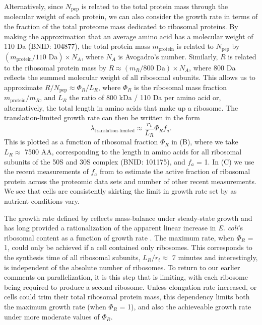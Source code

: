 Alternatively, since $N_\text{pep}$ is related to the total protein mass through
the molecular weight of each protein, we can also consider the growth rate in
terms of the fraction of the total proteome mass dedicated to ribosomal
proteins. By making the approximation that an average amino acid has a molecular
weight of 110 Da (BNID: 104877), the total protein mass $m_\text{protein}$
is related to $N_\text{pep}$ by $(m_\text{protein}/\text{110 Da}) \times N_A$,
where $N_A$ is Avogadro's number. Similarly, $R$ is related to the ribosomal
protein mass by $R \approx (m_R/\text{800 Da}) \times N_A$, where 800 Da
reflects the summed molecular weight of all ribosomal subunits.  This allows us
to approximate  $R / N_\text{pep} \approx \Phi_R / L_R$,  where $\Phi_R$ is the
ribosomal mass fraction $m_\text{protein}/m_R$, and $L_R$ the ratio of 800
kDa / 110 Da per amino acid or, alternatively, the total length in amino acids
that make up a ribosome. The translation-limited growth rate can then be written
in the form
\begin{equation}
\lambda_{\textrm{translation-limited}} \approx \frac{r_t}{L_R}  \Phi_R f_a.
\label{eq:translation_limit_growth_rate}
\end{equation}
This is plotted as a function of ribosomal fraction $\Phi_R$ in
(B), where we take $L_R \approx$ 7500 AA, corresponding to the
length in amino acids for all ribosomal subunits of the 50S and 30S complex
(BNID: 101175), and $f_a$ = 1. In (C) we use the
recent measurements of $f_a$ from \cite{dai2016} to estimate the active fraction of
ribosomal protein across the proteomic data sets and number of other recent
measurements. We see that cells are consistently skirting the limit in growth
rate set by  as nutrient conditions vary.

The growth rate defined by  reflects
mass-balance under steady-state growth and has long provided a rationalization
of the apparent linear increase in \textit{E. coli}'s ribosomal content as a
function of growth rate \citep{goldberger1979, scott2010}. The maximum rate,
when $\Phi_R$ = 1, could only be achieved if a cell contained only ribosomes.
This corresponds to the synthesis time of all ribosomal subunits, $L_R/ r_t
\approx$ 7 minutes \citep{dill2011} and interestingly, is independent of the
absolute number of ribosomes. To return to our earlier comments on
parallelization,  it is this step that is limiting, with each ribosome being
required to produce a second ribosome. Unless elongation rate increased, or
cells could trim their total ribosomal protein mass, this dependency limits both
the maximum growth rate (when $\Phi_R$ = 1), and also the achieveable growth
rate under more moderate values of $\Phi_R$.

